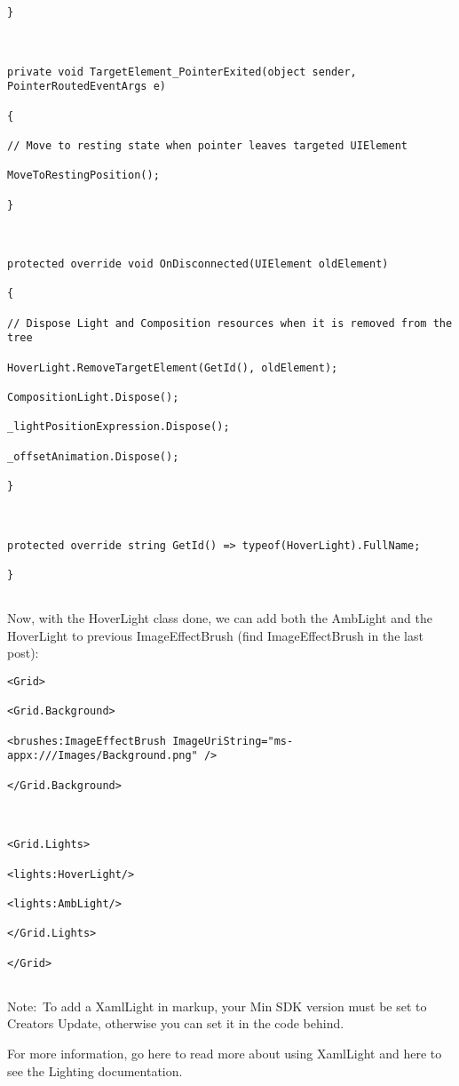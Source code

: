 \begin{lstlisting}[style=CSharpStyle]
}



private void TargetElement_PointerExited(object sender, PointerRoutedEventArgs e)

{

// Move to resting state when pointer leaves targeted UIElement

MoveToRestingPosition();

}



protected override void OnDisconnected(UIElement oldElement)

{

// Dispose Light and Composition resources when it is removed from the tree

HoverLight.RemoveTargetElement(GetId(), oldElement);

CompositionLight.Dispose();

_lightPositionExpression.Dispose();

_offsetAnimation.Dispose();

}



protected override string GetId() => typeof(HoverLight).FullName;

}


\end{lstlisting}

Now, with the HoverLight class done, we can add both the AmbLight and the HoverLight to previous ImageEffectBrush (find ImageEffectBrush in the last post):

\begin{lstlisting}[style=XamlStyle]
<Grid>

<Grid.Background>

<brushes:ImageEffectBrush ImageUriString="ms-appx:///Images/Background.png" />

</Grid.Background>



<Grid.Lights>

<lights:HoverLight/>

<lights:AmbLight/>

</Grid.Lights>

</Grid>


\end{lstlisting}

Note: To add a XamlLight in markup, your Min SDK version must be set to Creators Update, otherwise you can set it in the code behind.

For more information, go here to read more about using XamlLight and here to see the Lighting documentation.

